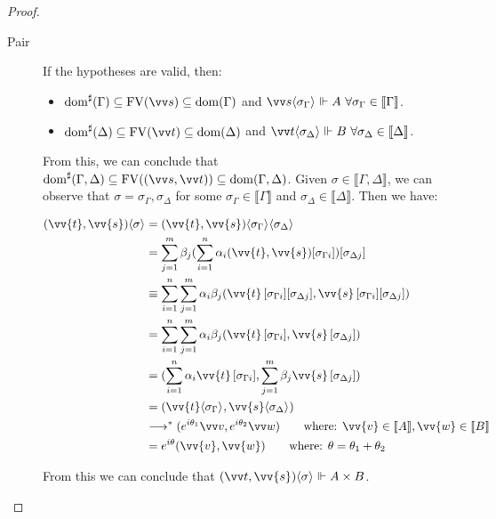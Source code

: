 \documentclass[runningheads,orivec,envcountsame,envcountsect]{llncs}
\newcommand\lra{\longrightarrow}
\newcommand\ansubst[2]{\ensuremath{\langle #1 \rangle_{#2}}}
\newcommand\dom[1]{\mathrm{dom}(#1)}
\newcommand\sdom[1]{\mathrm{dom}^{\sharp}(#1)}
\newcommand\FV[1]{\mathrm{FV}(#1)}
\def\Pair#1#2{(#1,#2)} %
\def\eval{\lra^*}
\def\sem#1{\llbracket#1\rrbracket}
\def\real{\Vdash}
\begin{document}
\begin{proof}
\begin{description}
    \item[Pair] If the hypotheses are valid, then:

    \begin{itemize}
        \item $\sdom{\Gamma}\subseteq \FV{\vv s}\subseteq \dom{\Gamma}$ and $\vv s \ansubst{\sigma_\Gamma}{}\Vdash A\ \forall \sigma_\Gamma\in\sem{\Gamma}$.
        \item $\sdom{\Delta}\subseteq \FV{\vv t}\subseteq \dom{\Delta}$ and $\vv t\ansubst{\sigma_\Delta}{}\Vdash B\ \forall \sigma_\Delta\in\sem{\Delta}$.
    \end{itemize}
    
    From this, we can conclude that $\sdom{\Gamma,\Delta}\subseteq \FV{(\vv s, \vv t)}\subseteq \dom{\Gamma,\Delta}$. Given $\sigma\in\sem{\Gamma,\Delta}$, we can observe that $\sigma=\sigma_\Gamma,\sigma_\Delta$ for some  $\sigma_\Gamma\in\sem{\Gamma}$ and $\sigma_\Delta\in\sem{\Delta}$. Then we have:

    \begin{align*}
        \Pair{\vv{t}}{\vv{s}}\ansubst{\sigma}{} &= \Pair{\vv{t}}{\vv{s}}\ansubst{\sigma_\Gamma}{}\ansubst{\sigma_\Delta}{}\\
        &=\sum_{j=1}^{m} \beta_j (\sum_{i=1}^{n} \alpha_i \Pair{\vv{t}}{\vv{s}}[\sigma_{\Gamma i}])[\sigma_{\Delta j}]\\
        &\equiv\sum_{i=1}^{n}\sum_{j=1}^{m} \alpha_i \beta_j \Pair{\vv{t}\,[\sigma_{\Gamma i}][\sigma_{\Delta j}]}{\vv{s}\,[\sigma_{\Gamma i}][\sigma_{\Delta j}]}\\
        &=\sum_{i=1}^{n}\sum_{j=1}^{m} \alpha_i \beta_j \Pair{\vv{t}\,[\sigma_{\Gamma i}]}{\vv{s}\,[\sigma_{\Delta j}]}\\
        &=\Pair{\sum_{i=1}^{n} \alpha_i \vv{t}\, [\sigma_{\Gamma i}]}{\sum_{j=1}^{m} \beta_j \vv{s}\, [\sigma_{\Delta j}]}\\
        &=\Pair{\vv{t}\ansubst{\sigma_\Gamma}{}}{\vv{s}\ansubst{\sigma_\Delta}{}}\\
        &\eval \Pair{e^{i\theta_1}\vv v}{e^{i\theta_2}\vv w}\qquad\text{where: }\vv{v}\in\sem{A}, \vv{w}\in\sem{B}\\
        &= e^{i\theta} \Pair{\vv{v}}{\vv{w}}\qquad\text{where: }\theta=\theta_1 + \theta_2
    \end{align*}
    
    From this we can conclude that $\Pair{\vv t}{\vv{s}}\ansubst{\sigma}{}\real A\times B$.
    

\end{description}
\end{proof}
\end{document}
